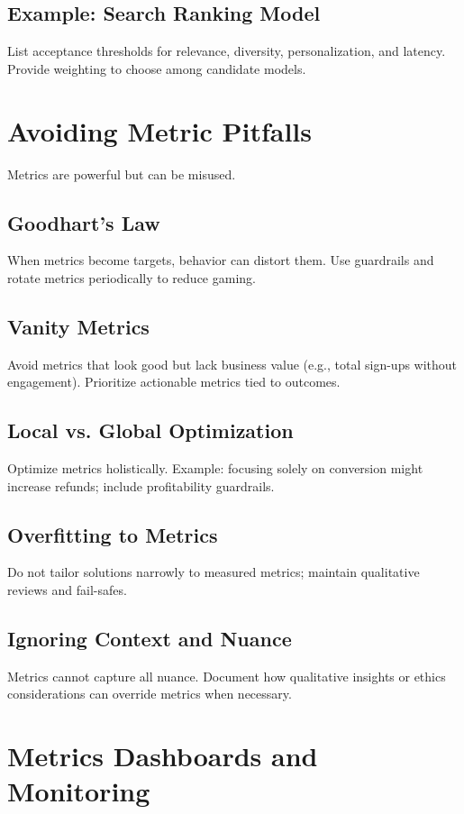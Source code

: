 \subsection{Example: Search Ranking Model}
List acceptance thresholds for relevance, diversity, personalization, and latency. Provide weighting to choose among candidate models.

\section{Avoiding Metric Pitfalls}
\label{sec:metric-pitfalls}

Metrics are powerful but can be misused.

\subsection{Goodhart's Law}
When metrics become targets, behavior can distort them. Use guardrails and rotate metrics periodically to reduce gaming.

\subsection{Vanity Metrics}
Avoid metrics that look good but lack business value (e.g., total sign-ups without engagement). Prioritize actionable metrics tied to outcomes.

\subsection{Local vs. Global Optimization}
Optimize metrics holistically. Example: focusing solely on conversion might increase refunds; include profitability guardrails.

\subsection{Overfitting to Metrics}
Do not tailor solutions narrowly to measured metrics; maintain qualitative reviews and fail-safes.

\subsection{Ignoring Context and Nuance}
Metrics cannot capture all nuance. Document how qualitative insights or ethics considerations can override metrics when necessary.

\section{Metrics Dashboards and Monitoring}
\label{sec:dashboards}

